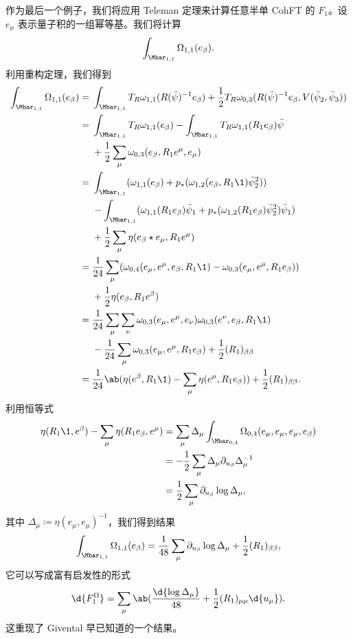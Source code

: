 \begin{exm}
    作为最后一个例子，我们将应用 Teleman 定理来计算任意半单 CohFT 的 $F_1$。设 $e_{\mu}$ 表示量子积的一组幂等基。我们将计算
    \[ \int_{\Mbar_{1,1}} \Omega_{1,1}(e_{\beta}). \]
    利用重构定理，我们得到
    \begin{align*}
        \int_{\Mbar_{1,1}}\Omega_{1,1}(e_{\beta}) ={}& \int_{\Mbar_{1,1}} T_R \omega_{1,1}(R(\bar{\psi})^{-1} e_{\beta}) + \frac{1}{2} T_R \omega_{0,3}(R(\bar{\psi})^{-1} e_{\beta}, V(\bar{\psi}_2, \bar{\psi}_3)) \\
        ={}& \int_{\Mbar_{1,1}}T_R\omega_{1,1}(e_{\beta}) - \int_{\Mbar_{1,1}} T_R \omega_{1,1}(R_1 e_{\beta})\bar{\psi} \\ 
        &+ \frac{1}{2}\sum_{\mu}  \omega_{0,3}(e_{\beta}, R_1 e^{\mu}, e_{\mu}) \\
        ={}& \int_{\Mbar_{1,1}} ( \omega_{1,1}(e_{\beta}) + p_* ( \omega_{1,2}(e_{\beta}, R_1 \1) \bar{\psi}_2^2 )) \\
        &- \int_{\Mbar_{1,1}} (\omega_{1,1}(R_1 e_{\beta})\bar{\psi}_1 + p_* ( \omega_{1,2}(R_1 e_{\beta}) \bar{\psi}_2^2 ) \bar{\psi}_1) \\
        &+ \frac{1}{2} \sum_{\mu} \eta(e_{\beta} \star e_{\mu}, R_1 e^{\mu}) \\
        ={}& \frac{1}{24} \sum_{\mu} ( \omega_{0,4}(e_{\mu}, e^{\mu}, e_{\beta}, R_1 \1) -\omega_{0,3}(e_{\mu}, e^{\mu}, R_1 e_{\beta}) )\\
        &+ \frac{1}{2} \eta(e_{\beta}, R_1 e^{\beta}) \\
        ={}& \frac{1}{24} \sum_{\mu}\sum_{\nu} \omega_{0,3}(e_{\mu}, e^{\mu}, e_{\nu})\omega_{0,3}(e^{\nu}, e_{\beta}, R_1 \1) \\
        &-\frac{1}{24} \sum_{\mu} \omega_{0,3}(e_{\mu}, e^{\mu}, R_1 e_{\beta}) + \frac{1}{2} (R_1)_{\beta\beta} \\
        ={}& \frac{1}{24} \ab(\eta(e^{\beta}, R_1 \1) - \sum_{\mu} \eta(e^{\mu}, R_1 e_{\beta})) + \frac{1}{2} (R_1)_{\beta\beta}.
    \end{align*}
    利用恒等式
    \begin{align*}
        \eta(R_1 \1, e^{\beta}) - \sum_{\mu} \eta(R_1 e_{\beta}, e^{\mu}) &= \sum_{\mu} \Delta_{\mu} \int_{\Mbar_{0,4}} \Omega_{0,4}(e_{\mu}, e_{\mu}, e_{\mu}, e_{\beta}) \\
        &= -\frac{1}{2}\sum_{\mu} \Delta_{\mu} \partial_{u_{\beta}} \Delta_{\mu}^{-1} \\
        &= \frac{1}{2} \sum_{\mu} \partial_{u_{\beta}} \log \Delta_{\mu},
    \end{align*}
    其中 $\Delta_{\mu} \coloneqq \eta(e_{\mu}, e_{\mu})^{-1}$，我们得到结果
    \[ \int_{\Mbar_{1,1}} \Omega_{1,1}(e_{\beta}) = \frac{1}{48} \sum_{\mu} \partial_{u_{\beta}} \log \Delta_{\mu} + \frac{1}{2} (R_1)_{\beta\beta}, \]
    它可以写成富有启发性的形式
    \[ \d{F_1^{\Omega}} = \sum_{\mu} \ab( \frac{\d{\log \Delta_{\mu}}}{48} + \frac{1}{2} (R_1)_{\mu\mu} \d{u_{\mu}} ). \]
    这重现了 Givental 早已知道的一个结果。
\end{exm}

